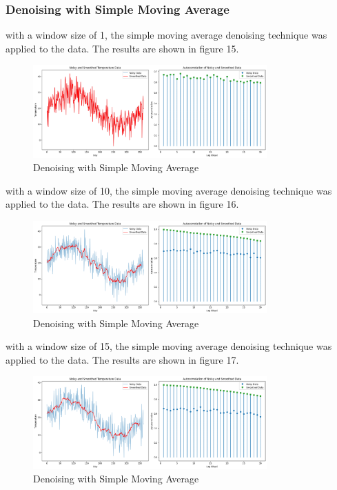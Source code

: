 \documentclass[a4paper,12pt]{article} %
\begin{document}
\subsubsection{ Denoising with Simple Moving Average}
with a window size of 1, the simple moving average denoising technique was applied to the data. The results are shown in figure 15.
\begin{figure}[h]
\centering
\includegraphics[width=0.8\textwidth]{Q2_SMA.png}
\caption{Denoising with Simple Moving Average}
\end{figure}
\clearpage
with a window size of 10, the simple moving average denoising technique was applied to the data. The results are shown in figure 16.
\begin{figure}[h]
\centering
\includegraphics[width=0.8\textwidth]{Q2_SMA_4.png}
\caption{Denoising with Simple Moving Average}
\end{figure}
\clearpage
with a window size of 15, the simple moving average denoising technique was applied to the data. The results are shown in figure 17.
\begin{figure}[h]
\centering
\includegraphics[width=0.8\textwidth]{Q2_SMA_15.png}
\caption{Denoising with Simple Moving Average}
\end{figure}
\clearpage
\end{document}
